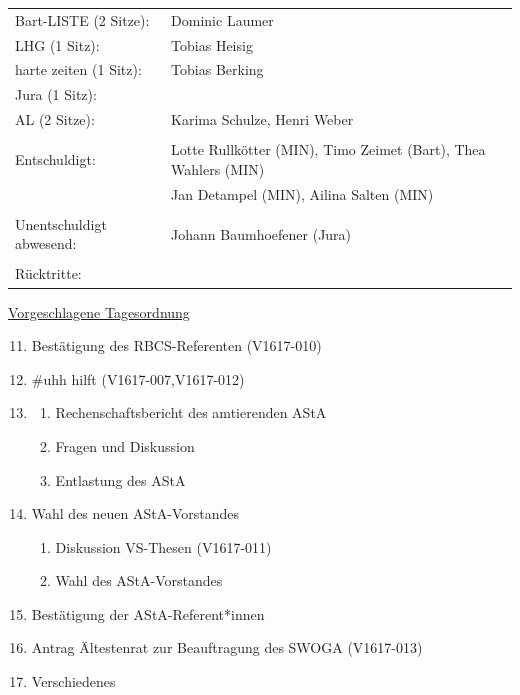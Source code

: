 \documentclass[ngerman,headheight=70pt]{scrartcl}
\begin{document}
\begin{tabular}{ll}
             Bart-LISTE (2 Sitze): & Dominic Laumer \\
             LHG (1 Sitz): & Tobias Heisig \\
             harte zeiten (1 Sitz): & Tobias Berking \\
             Jura (1 Sitz): &  \\
             AL (2 Sitze): & Karima Schulze, Henri Weber \\
            & \\
        Entschuldigt: & Lotte Rullkötter (MIN), Timo Zeimet (Bart), Thea Wahlers (MIN)\\
                      & Jan Detampel (MIN), Ailina Salten (MIN)\\
                      & \\
        Unentschuldigt abwesend: &  Johann Baumhoefener (Jura)\\
                                &\\
        Rücktritte: & \\
    \end{tabular}
    \newpage
    \underline{Vorgeschlagene Tagesordnung}
    \begin{enumerate}[label={\textbf{Top \theenumi}},leftmargin=*]
        \setcounter{enumi}{10}
        \item Bestätigung des RBCS-Referenten (V1617-010)
        \item \#uhh hilft (V1617-007,V1617-012)
        \item
            \begin{enumerate}
                \item Rechenschaftsbericht des amtierenden AStA
                \item Fragen und Diskussion
                \item Entlastung des AStA
            \end{enumerate}
        \item Wahl des neuen AStA-Vorstandes
            \begin{enumerate}
                \item Diskussion VS-Thesen (V1617-011)
                \item Wahl des AStA-Vorstandes
            \end{enumerate}
        \item Bestätigung der AStA-Referent*innen
        \item Antrag Ältestenrat zur Beauftragung des SWOGA (V1617-013)
        \item Verschiedenes
    \end{enumerate}
\end{document}
